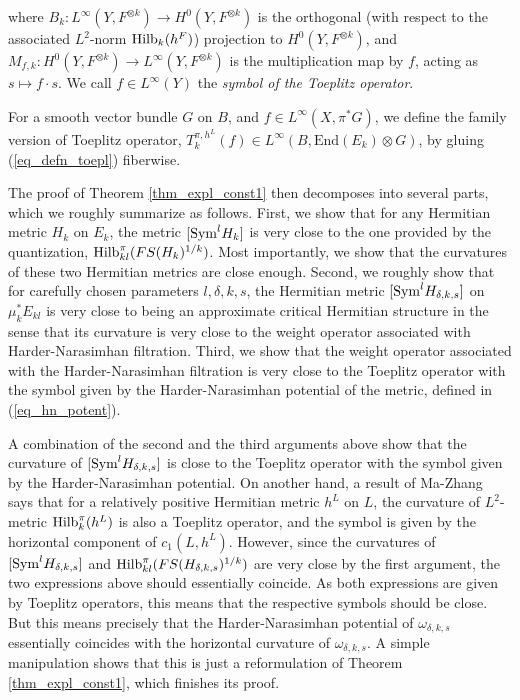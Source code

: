 \documentclass[12pt]{article}
\numberwithin{equation}{section}
\theoremstyle{theorem}
\theoremstyle{definition}
\theoremstyle{remark}
\newcommand{\enmr}[1]{\text{End}{(#1)}}
\begin{document}
	where $B_k : L^{\infty}(Y, F^{\otimes k}) \to H^0(Y, F^{\otimes k})$ is the orthogonal (with respect to the associated $L^2$-norm ${\rm{Hilb}}_{k}(h^F)$) projection to $H^0(Y, F^{\otimes k})$, and $M_{f, k} : H^0(Y, F^{\otimes k}) \to L^{\infty}(Y, F^{\otimes k})$ is the multiplication map by $f$, acting as $s \mapsto f \cdot s$.
	We call $f \in L^{\infty}(Y)$ the \textit{symbol of the Toeplitz operator}.
	\par 
	For a smooth vector bundle $G$ on $B$, and $f \in L^{\infty}(X, \pi^* G)$, we define the family version of Toeplitz operator, $T_k^{\pi, h^L}(f) \in L^{\infty}(B, \enmr{E_k} \otimes G)$, by gluing (\ref{eq_defn_toepl}) fiberwise.
	\par 
	The proof of Theorem \ref{thm_expl_const1} then decomposes into several parts, which we roughly summarize as follows.
	First, we show that for any Hermitian metric $H_k$ on $E_k$, the metric $[{\rm{Sym}}^l H_k]$ is very close to the one provided by the quantization, ${\rm{Hilb}}_{kl}^{\pi}(FS(H_k)^{1/k})$.
	Most importantly, we show that the curvatures of these two Hermitian metrics are close enough.
	Second, we roughly show that for carefully chosen parameters $l, \delta, k, s$, the Hermitian metric $[{\rm{Sym}}^l H_{\delta, k, s}]$ on $\mu_k^* E_{kl}$ is very close to being an approximate critical Hermitian structure in the sense that its curvature is very close to the weight operator associated with Harder-Narasimhan filtration.
	Third, we show that the weight operator associated with the Harder-Narasimhan filtration is very close to the Toeplitz operator with the symbol given by the Harder-Narasimhan potential of the metric, defined in (\ref{eq_hn_potent}).
	\par 
	\begin{sloppypar}
	A combination of the second and the third arguments above show that the curvature of $[{\rm{Sym}}^l H_{\delta, k, s}]$ is close to the Toeplitz operator with the symbol given by the Harder-Narasimhan potential.
	On another hand, a result of Ma-Zhang \cite{MaZhangSuperconnBKPubl} says that for a relatively positive Hermitian metric $h^L$ on $L$, the curvature of $L^2$-metric ${\rm{Hilb}}_{k}^{\pi}(h^L)$ is also a Toeplitz operator, and the symbol is given by the horizontal component of $c_1(L, h^L)$. 
	However, since the curvatures of $[{\rm{Sym}}^l H_{\delta, k, s}]$ and ${\rm{Hilb}}_{kl}^{\pi}(FS(H_{\delta, k, s})^{1/k})$ are very close by the first argument, the two expressions above should essentially coincide. 
	As both expressions are given by Toeplitz operators, this means that the respective symbols should be close. 
	But this means precisely that the Harder-Narasimhan potential of $\omega_{\delta, k, s}$ essentially coincides with the horizontal curvature of $\omega_{\delta, k, s}$. 
	A simple manipulation shows that this is just a reformulation of Theorem \ref{thm_expl_const1}, which finishes its proof.
	\end{sloppypar}
\end{document}
